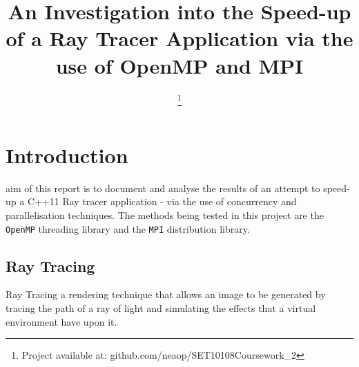\documentclass[journal,transmag]{IEEEtran}
\begin{document}
\title{An Investigation into the Speed-up of a Ray Tracer Application via the use of OpenMP and MPI}

\author{

\thanks{Project available at: github.com/neaop/SET10108Coursework\_2}}




\maketitle

\IEEEdisplaynontitleabstractindextext

\IEEEpeerreviewmaketitle

\section{Introduction}
 
	 aim of this report is to document and analyse the results of an attempt to speed-up a C++11 Ray tracer application - via the use of concurrency and parallelisation techniques. The methods being tested in this project are the \texttt{OpenMP} threading library and the \texttt{MPI} distribution library.
	
	\subsection{Ray Tracing}
		Ray Tracing a rendering technique that allows an image to be generated by tracing the path of a ray of light and simulating the effects that a virtual environment have upon it.
	
\end{document}
